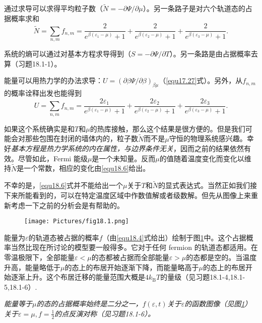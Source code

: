 通过求导可以求得平均粒子数（$\tilde N=-\partial\Psi/\partial\mu$）。另一条路子是对六个轨道态的占据概率求和
\begin{equation}
\tilde N = \sum\limits_{n,m}f_{n,m} = \frac{2}{e^{\beta(\varepsilon_1-\mu)}+1}+\frac{2}{e^{\beta(\varepsilon_2-\mu)}+1}+\frac{2}{e^{\beta(\varepsilon_3-\mu)}+1}.
\label{equ18.6}
\end{equation}

系统的熵可以通过对基本方程求导得到（$S=-\partial\Psi/\partial T$）。另一条路是由占据概率去算（习题18.1-1）。

能量可以用热力学的办法求导：$U=(\partial\beta\Psi/\partial\beta)_{\beta\mu}$（\eqref{equ17.27}式）。另外，从$f_{n,m}$的概率诠释出发也能得到
\begin{equation}
U = \sum\limits_{n,m}f_{n,m} = \frac{2\varepsilon_1}{e^{\beta(\varepsilon_1-\mu)}+1}+\frac{2\varepsilon_2}{e^{\beta(\varepsilon_2-\mu)}+1}+\frac{2\varepsilon_3}{e^{\beta(\varepsilon_3-\mu)}+1}.
\label{equ18.7}
\end{equation}

如果这个系统确实是和$T$和$\mu$的热库接触，那么这个结果是很方便的。但是我们可能会对那些包围在封闭的墙体内的，粒子数$\tilde N$而不是$\mu$守恒的物理系统感兴趣。幸好{\it 基本方程是热力学系统的内在属性，与边界条件无关}，因而之前的结果依然有效。尽管如此，Fermi 能级$\mu$是一个未知量。反而$\mu$的值随着温度变化而变化以维持$\tilde N$是一个常数，相应的变化由\eqref{equ18.6}给出。

不幸的是，\eqref{equ18.6}式并不能给出一个$\mu$关于$T$和$\tilde N$的显式表达式。当然正如我们接下来所能看到的，可以在特定温度区域中作数值解或者级数解。但先从图像上来重新考虑一下之前的分析会是有帮助的。

\begin{figure}
\texttt{[image: Pictures/fig18.1.png]}
\label{fig18.1}
\end{figure}

能量为$\varepsilon$的轨道态被占据的概率$f$（由\eqref{equ18.4}式给出）绘制于图\ref{fig18.1}中。这个占据概率当然比现在所讨论的模型要一般得多。它对于任何 fermion 的轨道态都适用。在零温极限下，全部能量$\varepsilon<\mu$的态都被占据而全部能量$\varepsilon>\mu$的态都是空的。当温度升高，能量略低于$\mu$的态上的布居开始逐渐下降，而能量略高于$\mu$的态上的布居开始逐渐上升。这个布居迁移的能量范围大概是$4k_\text{B}T$的量级（见习题18.1-4,18.1-5,18.1-6）.

{\it 能量等于$\mu$的态的占据概率始终是二分之一，$f(\varepsilon,t)$关于$\varepsilon$的函数图像（见图\ref{fig18.1}）关于$\varepsilon=\mu,f=\frac{1}{2}$的点反演对称（见习题18.1-6）。}

